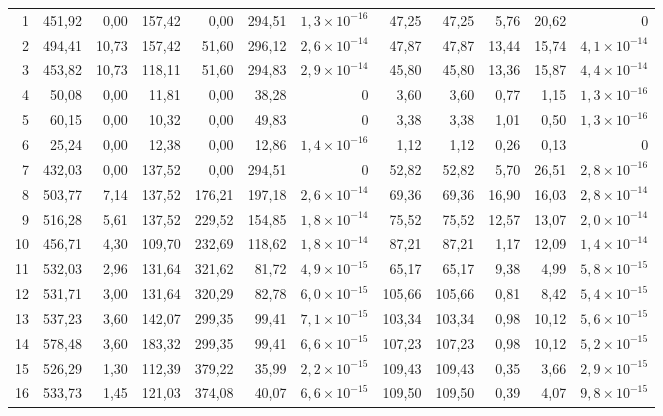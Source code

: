 \documentclass[11pt,a4paper]{article}
\numberwithin{equation}{section}
\numberwithin{table}{section}
\numberwithin{figure}{section}
\begin{document}
\begin{landscape}
\begin{longtable}{rrrrrrrrrrrr}
1 & 451,92 & 0,00 & 157,42 & 0,00 & 294,51 & $1{,}3\times10^{-16}$ & 47,25 & 47,25 & 5,76 & 20,62 & $0$\\
2 & 494,41 & 10,73 & 157,42 & 51,60 & 296,12 & $2{,}6\times10^{-14}$ & 47,87 & 47,87 & 13,44 & 15,74 & $4{,}1\times10^{-14}$\\
3 & 453,82 & 10,73 & 118,11 & 51,60 & 294,83 & $2{,}9\times10^{-14}$ & 45,80 & 45,80 & 13,36 & 15,87 & $4{,}4\times10^{-14}$\\
4 & 50,08 & 0,00 & 11,81 & 0,00 & 38,28 & $0$ & 3,60 & 3,60 & 0,77 & 1,15 & $1{,}3\times10^{-16}$\\
5 & 60,15 & 0,00 & 10,32 & 0,00 & 49,83 & $0$ & 3,38 & 3,38 & 1,01 & 0,50 & $1{,}3\times10^{-16}$\\
6 & 25,24 & 0,00 & 12,38 & 0,00 & 12,86 & $1{,}4\times10^{-16}$ & 1,12 & 1,12 & 0,26 & 0,13 & $0$\\
7 & 432,03 & 0,00 & 137,52 & 0,00 & 294,51 & $0$ & 52,82 & 52,82 & 5,70 & 26,51 & $2{,}8\times10^{-16}$\\
8 & 503,77 & 7,14 & 137,52 & 176,21 & 197,18 & $2{,}6\times10^{-14}$ & 69,36 & 69,36 & 16,90 & 16,03 & $2{,}8\times10^{-14}$\\
9 & 516,28 & 5,61 & 137,52 & 229,52 & 154,85 & $1{,}8\times10^{-14}$ & 75,52 & 75,52 & 12,57 & 13,07 & $2{,}0\times10^{-14}$\\
10 & 456,71 & 4,30 & 109,70 & 232,69 & 118,62 & $1{,}8\times10^{-14}$ & 87,21 & 87,21 & 1,17 & 12,09 & $1{,}4\times10^{-14}$\\
11 & 532,03 & 2,96 & 131,64 & 321,62 & 81,72 & $4{,}9\times10^{-15}$ & 65,17 & 65,17 & 9,38 & 4,99 & $5{,}8\times10^{-15}$\\
12 & 531,71 & 3,00 & 131,64 & 320,29 & 82,78 & $6{,}0\times10^{-15}$ & 105,66 & 105,66 & 0,81 & 8,42 & $5{,}4\times10^{-15}$\\
13 & 537,23 & 3,60 & 142,07 & 299,35 & 99,41 & $7{,}1\times10^{-15}$ & 103,34 & 103,34 & 0,98 & 10,12 & $5{,}6\times10^{-15}$\\
14 & 578,48 & 3,60 & 183,32 & 299,35 & 99,41 & $6{,}6\times10^{-15}$ & 107,23 & 107,23 & 0,98 & 10,12 & $5{,}2\times10^{-15}$\\
15 & 526,29 & 1,30 & 112,39 & 379,22 & 35,99 & $2{,}2\times10^{-15}$ & 109,43 & 109,43 & 0,35 & 3,66 & $2{,}9\times10^{-15}$\\
16 & 533,73 & 1,45 & 121,03 & 374,08 & 40,07 & $6{,}6\times10^{-15}$ & 109,50 & 109,50 & 0,39 & 4,07 & $9{,}8\times10^{-15}$\\
\bottomrule\end{longtable}
\end{landscape}
\end{document}
